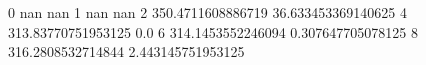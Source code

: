 0 nan nan
1 nan nan
2 350.4711608886719 36.633453369140625
4 313.83770751953125 0.0
6 314.1453552246094 0.307647705078125
8 316.2808532714844 2.443145751953125
